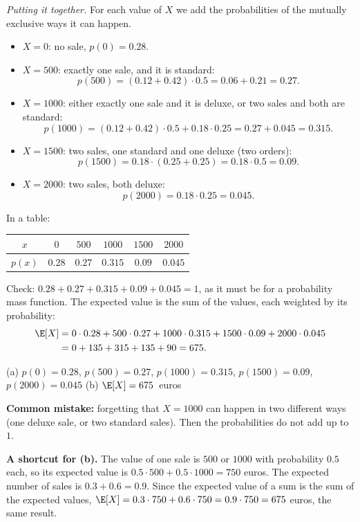 \begin{solution}
	\emph{Putting it together.} For each value of $X$ we add the
	probabilities of the mutually exclusive ways it can happen.
	\begin{itemize}
		\item $X=0$: no sale, $p(0)=0.28$.
		\item $X=500$: exactly one sale, and it is standard:
		      \[ p(500)=(0.12+0.42)\cdot0.5=0.06+0.21=0.27. \]
		\item $X=1000$: either exactly one sale and it is deluxe, or two
		      sales and both are standard:
		      \[ p(1000)=(0.12+0.42)\cdot0.5+0.18\cdot0.25=0.27+0.045=0.315. \]
		\item $X=1500$: two sales, one standard and one deluxe (two orders):
		      \[ p(1500)=0.18\cdot(0.25+0.25)=0.18\cdot0.5=0.09. \]
		\item $X=2000$: two sales, both deluxe:
		      \[ p(2000)=0.18\cdot0.25=0.045. \]
	\end{itemize}
	In a table:
	\begin{center}
		\begin{tabular}{c|ccccc}
			$x$    & $0$    & $500$  & $1000$  & $1500$ & $2000$  \\ \hline
			$p(x)$ & $0.28$ & $0.27$ & $0.315$ & $0.09$ & $0.045$
		\end{tabular}
	\end{center}
	Check: $0.28+0.27+0.315+0.09+0.045=1$, as it must be for a probability
	mass function.
	 The expected value is the sum of the values, each weighted by
	its probability:
	\[
		\begin{aligned}
			\E[X] & =0\cdot0.28+500\cdot0.27+1000\cdot0.315+1500\cdot0.09+2000\cdot0.045 \\
			      & =0+135+315+135+90=675.
		\end{aligned}
	\]
	\begin{answer}
		(a) $p(0)=0.28$, $p(500)=0.27$, $p(1000)=0.315$, $p(1500)=0.09$,
		$p(2000)=0.045$ \quad (b) \mbox{$\E[X]=675$ euros}
	\end{answer}
	\begin{remark}
		\textbf{Common mistake:} forgetting that $X=1000$ can happen in two
		different ways (one deluxe sale, or two standard sales). Then the
		probabilities do not add up to $1$.

		\textbf{A shortcut for (b).} The value of one sale is $500$ or $1000$
		with probability $0.5$ each, so its expected value is
		$0.5\cdot500+0.5\cdot1000=750$ euros. The expected number of sales
		is $0.3+0.6=0.9$. Since the expected value of a sum is the sum of the
		expected values, $\E[X]=0.3\cdot750+0.6\cdot750=0.9\cdot750=675$
		euros, the same result.
	\end{remark}
\end{solution}
